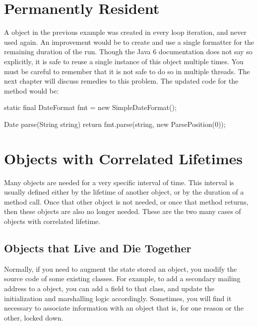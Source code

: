 



\section{Permanently Resident}
\label{forever-lifetime}

A  object in the previous example was created in every
loop iteration, and never used again. An improvement would be to create and
use a single formatter for the remaining duration of the run. Though the Java 6
documentation does not say so explicitly, it is safe to reuse a single instance
of this object multiple times. You must be careful to remember that it is
not safe to do so in multiple threads. The next chapter will discuss remedies
to this problem. The updated code for the  method would be:

\begin{shortlisting}
static final DateFormat fmt = new SimpleDateFormat();

Date parse(String string) {
	return fmt.parse(string, new ParsePosition(0));
}
\end{shortlisting} 

\section{Objects with Correlated Lifetimes}
\label{correlated-lifetime}

Many objects are needed for a very specific interval of time. This interval is
usually defined either by the lifetime of another object, or by the duration of
a method call. Once that other object is not needed, or once that method
returns, then these objects are also no longer needed. These are the two many
cases of objects with correlated lifetime.

\subsection{Objects that Live and Die Together}
\label{correlated-lifetime-1}

Normally, if you need to augment the state stored an object, you modify
the source code of some existing classes. For example, to add a secondary
mailing address to a  object, you can add a field to that class, and update the
initialization and marshalling logic accordingly. Sometimes, you will find it
necessary to associate information with an object that is, for one reason or the
other, locked down.

